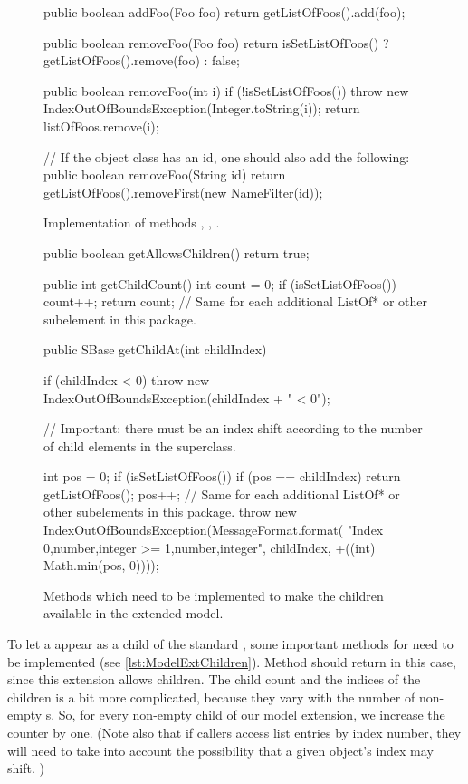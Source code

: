\begin{figure}[t]
  \begin{example}[numbers=left]
public boolean addFoo(Foo foo) {
    return getListOfFoos().add(foo);
}

public boolean removeFoo(Foo foo) {
  return isSetListOfFoos() ? getListOfFoos().remove(foo) : false;
}

public boolean removeFoo(int i) {
  if (!isSetListOfFoos()) {
    throw new IndexOutOfBoundsException(Integer.toString(i));
  }
  return listOfFoos.remove(i);
}

// If the object class has an id, one should also add the following:
public boolean removeFoo(String id) {
  return getListOfFoos().removeFirst(new NameFilter(id));
}\end{example}
  \caption{Implementation of  methods ,
    , .}
  \label{lst:ModelExtAddRemoveFoos}
\end{figure}

\begin{figure}[hb]
  \begin{example}[numbers=left]
public boolean getAllowsChildren() {
  return true;
}

public int getChildCount() {
  int count = 0;
  if (isSetListOfFoos()) {
    count++;
  }
  return count;  // Same for each additional ListOf* or other subelement in this package.
}

public SBase getChildAt(int childIndex) {
  if (childIndex < 0) {
    throw new IndexOutOfBoundsException(childIndex + " < 0");
  }

  // Important: there must be an index shift according to the number of child elements in the superclass.

  int pos = 0;
  if (isSetListOfFoos()) {
    if (pos == childIndex) {
      return getListOfFoos();
    }
    pos++;
  }
  // Same for each additional ListOf* or other subelements in this package.
  throw new IndexOutOfBoundsException(MessageFormat.format(
    "Index {0,number,integer} >= {1,number,integer}", childIndex, +((int) Math.min(pos, 0))));
}\end{example}
  \caption{Methods which need to be implemented to make the children
    available in the extended model.}
  \label{lst:ModelExtChildren}
\end{figure}

To let a  appear as a child of the standard \Model, some
important methods for \TreeNode need to be implemented (see
\vref{lst:ModelExtChildren}).  Method  should
return  in this case, since this extension allows children.  The
child count and the indices of the children is a bit more complicated,
because they vary with the number of non-empty s.  So, for
every non-empty  child of our model extension, we increase the
counter by one.  (Note also that if callers access list entries by index
number, they will need to take into account the possibility that a given
object's index may shift. )


